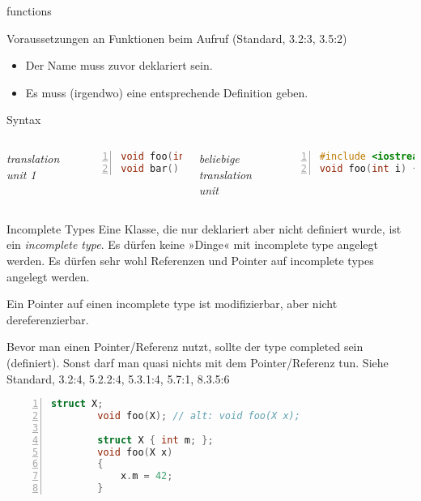 \begin{frame}[fragile]{functions}
	\begin{block}{Voraussetzungen an Funktionen beim Aufruf (Standard, 3.2:3, 3.5:2)}
		\begin{itemize}
			\item Der Name muss zuvor deklariert sein.
			\item Es muss (irgendwo) eine entsprechende Definition geben.
		\end{itemize}
	\end{block}
	
	\begin{block}{Syntax}
		\begin{columns}[t]
			\emph{translation unit 1}
			\vspace{0.5em}
			\begin{lstlisting}[language=C++, basicstyle=\footnotesize, numbers=left, numberstyle=\tiny\color{gray}, tabsize=6, xleftmargin=2em]
void foo(int i);
void bar() { foo(42); }
			\end{lstlisting}
			
			\emph{beliebige translation unit}
			\vspace{0.5em}
			\begin{lstlisting}[language=C++, basicstyle=\footnotesize, numbers=left, numberstyle=\tiny\color{gray}, tabsize=6, xleftmargin=2em]
#include <iostream>
void foo(int i) { std::cout << i; }
			\end{lstlisting}
		\end{columns}
	\end{block}
\end{frame}

\begin{frame}[fragile]{Incomplete Types}
	Eine Klasse, die nur deklariert aber nicht definiert wurde, ist ein \emph{incomplete type}.
	Es dürfen keine »Dinge« mit incomplete type angelegt werden.
	Es dürfen sehr wohl Referenzen und Pointer auf incomplete types angelegt werden.
	
	Ein Pointer auf einen incomplete type ist modifizierbar, aber nicht dereferenzierbar.
	
	Bevor man einen Pointer/Referenz nutzt, sollte der type completed sein (definiert). Sonst darf man quasi nichts mit dem Pointer/Referenz tun. Siehe Standard, 3.2:4, 5.2.2:4, 5.3.1:4, 5.7:1, 8.3.5:6
	
	\begin{lstlisting}[language=C++, basicstyle=\footnotesize, numbers=left, numberstyle=\tiny\color{gray}, tabsize=6, xleftmargin=2em]
		struct X;
		void foo(X); // alt: void foo(X x);
		
		struct X { int m; };
		void foo(X x)
		{
			x.m = 42;
		}
	\end{lstlisting}
\end{frame}

